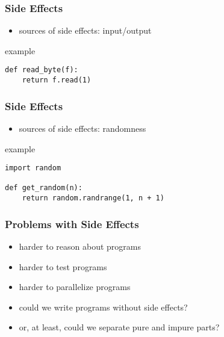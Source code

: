 \documentclass[dvipsnames]{beamer}
\theoremstyle{plain}
\begin{document}
\begin{frame}[fragile]
  \frametitle{Side Effects}

  \begin{itemize}
    \item sources of side effects: input/output
  \end{itemize}

  \begin{exampleblock}{example}
    \begin{lstlisting}
def read_byte(f):
    return f.read(1)
    \end{lstlisting}
  \end{exampleblock}
\end{frame}

\begin{frame}[fragile]
  \frametitle{Side Effects}

  \begin{itemize}
    \item sources of side effects: randomness
  \end{itemize}

  \begin{exampleblock}{example}
    \begin{lstlisting}
import random

def get_random(n):
    return random.randrange(1, n + 1)
    \end{lstlisting}
  \end{exampleblock}
\end{frame}

\begin{frame}
  \frametitle{Problems with Side Effects}

  \begin{itemize}
    \item harder to reason about programs
    \item harder to test programs
    \item harder to parallelize programs

    \pause
    \bigskip
    \item could we write programs without side effects?
    \item or, at least, could we separate pure and impure parts?
  \end{itemize}
\end{frame}
\end{document}
